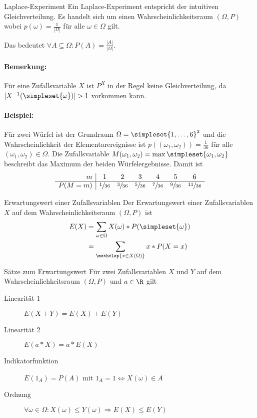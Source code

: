 \begin{definition}{Laplace-Experiment}
	Ein Laplace-Experiment entspricht der intuitiven Gleichverteilung. Es handelt sich um einen Wahrscheinlichkeitsraum $(\Omega,P)$ wobei $p(\omega)=\frac 1{|\Omega|}$ für alle $\omega\in\Omega$ gilt.
	
	Das bedeutet $\forall A\subseteq \Omega:P(A)=\frac{|A|}{|\Omega|}$.
\end{definition}
\paragraph{Bemerkung:}
Für eine Zufallsvariable $X$ ist $P^X$ in der Regel keine Gleichverteilung, da $|X^{-1}(\simpleset{\omega})|>1$ vorkommen kann.

\paragraph{Beispiel:}
Für zwei Würfel ist der Grundraum $\Omega=\simpleset{1,\ldots,6}^2$ und die Wahrscheinlichkeit der Elementarereignisse ist $p((\omega_1,\omega_2))=\frac{1}{36}$ für alle $(\omega_1,\omega_2)\in\Omega$. Die Zufallsvariable $M(\omega_1,\omega_2)=\max\simpleset{\omega_1,\omega_2}$ beschreibt das Maximum der beiden Würfelergebnisse. Damit ist 
\begin{equation*}
	\begin{array}{r|cccccc}
		m&1&2&3&4&5&6\\
		\hline P(M=m)&\sfrac{1}{36}&\sfrac{3}{36}&\sfrac{5}{36}&\sfrac{7}{36}&\sfrac{9}{36}&\sfrac{11}{36}
	\end{array}
\end{equation*}

\begin{definition}{Erwartungswert einer Zufallsvariablen}
	Der Erwartungswert einer Zufallsvariablen $X$ auf dem Wahrscheinlichkeitsraum $(\Omega,P)$ ist
	\begin{align*}
		E(X)&=\sum_{\omega\in\Omega} X(\omega)*P(\simpleset{\omega})\\
		&=\sum_{\mathclap{x\in X(\Omega)}}x*P(X=x)
	\end{align*}
\end{definition}

\begin{satz}{Sätze zum Erwartungswert}
	Für zwei Zufallsvariablen $X$ und $Y$ auf dem Wahrscheinlichkeitsraum $(\Omega,P)$ und $a\in\R$ gilt
	\begin{description}
		\item[Linearität 1] $E(X+Y)=E(X)+E(Y)$
		\item[Linearität 2] $E(a*X)=a*E(X)$
		\item[Indikatorfunktion] $E(1_A)=P(A)$ mit $1_A=1\Leftrightarrow X(\omega)\in A$
		\item[Ordnung] $\forall \omega\in\Omega: X(\omega)\leq Y(\omega) \Rightarrow E(X)\leq E(Y)$
	\end{description}
\end{satz}


